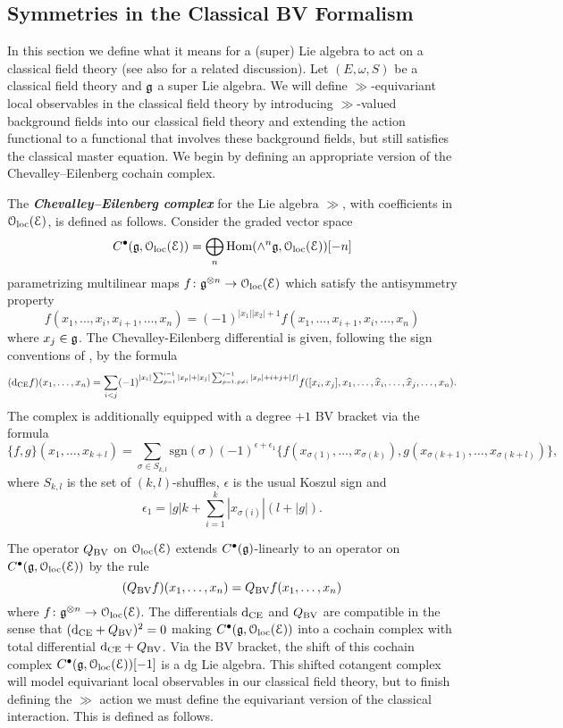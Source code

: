 \documentclass[10pt, oneside]{article}
\newcommand{\defterm}[1]{\textbf{\emph{#1}}}
\begin{document}
\subsection{Symmetries in the Classical BV Formalism} \label{symmetry_section}
In this section we define what it means for a (super) Lie algebra to act on a classical field theory  (see also \cite[Chapter 11]{Book2} for a related discussion). Let $(E, \omega, S)$ be a classical field theory and $\mathfrak g$ a super Lie algebra.  We will define $\gg$-equivariant local observables in the classical field theory by introducing $\gg$-valued background fields into our classical field theory and extending the action functional to a functional that involves these background fields, but still satisfies the classical master equation.  We begin by defining an appropriate version of the Chevalley--Eilenberg cochain complex.

\begin{definition}
The \defterm{Chevalley--Eilenberg complex} for the Lie algebra $\gg$, with coefficients in $\mathcal{O}_{\rm loc}(\mathcal E)$, is defined as follows.  Consider the graded vector space
\[C^\bullet(\mathfrak g, \mathcal{O}_{\rm loc}(\mathcal E)) = \bigoplus_n \operatorname{Hom}(\wedge^n \mathfrak g, \mathcal{O}_{\rm loc}(\mathcal E))[-n]\]
parametrizing multilinear maps $f\colon \mathfrak g^{\otimes n}\rightarrow \mathcal{O}_{\rm loc}(\mathcal E)$ which satisfy the antisymmetry property
\[f(x_1, \dots, x_i, x_{i+1}, \dots, x_n) = (-1)^{|x_1||x_2|+1} f(x_1, \dots, x_{i+1}, x_i, \dots, x_n)\]
where $x_j \in \mathfrak g$.  The Chevalley-Eilenberg differential is given, following the sign conventions of \cite{SafronovCoisoInt}, by the formula
\[({\rm d}_{\mathrm{CE}} f)(x_1, \dots, x_n) = \sum_{i < j}(-1)^{|x_i| \sum_{p=1}^{i-1} |x_p| + |x_j| \sum_{p=1,p\neq i}^{j-1} |x_p| +i+j+|f|} f([x_i, x_j], x_1, \dots, \widehat{x}_i, \dots, \widehat{x}_j, \dots, x_n).\]
The complex is additionally equipped with a degree $+1$ BV bracket via the formula
\[\{f, g\}(x_1, \dots, x_{k+l}) = \sum_{\sigma\in S_{k, l}} \mathrm{sgn}(\sigma) (-1)^{\epsilon+\epsilon_1} \{f(x_{\sigma(1)}, \dots, x_{\sigma(k)}), g(x_{\sigma(k+1)}, \dots, x_{\sigma(k+l)})\},\]
where $S_{k, l}$ is the set of $(k, l)$-shuffles, $\epsilon$ is the usual Koszul sign and
\[\epsilon_1 = |g|k + \sum_{i=1}^k |x_{\sigma(i)}|(l+|g|).\]
\end{definition}

The operator $Q_{\mathrm{BV}}$ on $\mathcal{O}_{\rm loc}(\mathcal E)$ extends $C^\bullet(\mathfrak g)$-linearly to an operator on $C^\bullet(\mathfrak g, \mathcal{O}_{\rm loc}(\mathcal E))$ by the rule
\[
(Q_{\mathrm{BV}} f)(x_1,\ldots, x_n) = Q_{\mathrm{BV}} f(x_1,\ldots, x_n) 
\]
where $f \colon \mathfrak g^{\otimes n} \to \mathcal{O}_{\rm loc}(\mathcal E)$. 
The differentials ${\rm d}_{\mathrm{CE}}$ and $Q_{\mathrm{BV}}$ are compatible in the sense that $({\rm d}_{\mathrm{CE}} + Q_{\mathrm{BV}})^2 = 0$ making $C^\bullet(\mathfrak g, \mathcal{O}_{\rm loc}(\mathcal E))$ into a cochain complex with total differential ${\rm d}_{\mathrm{CE}} + Q_{\mathrm{BV}}$. 
Via the BV bracket, the shift of this cochain complex $C^\bullet(\mathfrak g, \mathcal{O}_{\rm loc}(\mathcal E))[-1]$ is a dg Lie algebra.  This shifted cotangent complex will model equivariant local observables in our classical field theory, but to finish defining the $\gg$ action we must define the equivariant version of the classical interaction.  This is defined as follows.
\end{document}
